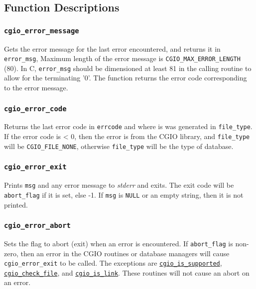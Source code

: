 \subsection{Function Descriptions}

\subsubsection{\texttt{cgio\_error\_message}} \label{error_message}
    \noindent
    Gets the error message for the last error encountered, and returns
    it in \texttt{error\_msg}, Maximum length of the error message is
    \texttt{CGIO\_MAX\_ERROR\_LENGTH} (80). In C, \texttt{error\_msg} should
    be dimensioned at least 81 in the calling routine
    to allow for the terminating '0'. The function returns the error
    code corresponding to the error message.

\subsubsection{\texttt{cgio\_error\_code}} \label{error_code}
    \noindent
    Returns the last error code in \texttt{errcode} and where is was
    generated in \texttt{file\_type}. If the error code is < 0, then
    the error is from the CGIO library, and \texttt{file\_type} will be
    \texttt{CGIO\_FILE\_NONE}, otherwise \texttt{file\_type} will be the
    type of database.

\subsubsection{\texttt{cgio\_error\_exit}} \label{error_exit}
    \noindent
    Prints \texttt{msg} and any error message to \textit{stderr} and exits.
    The exit code will be \texttt{abort\_flag} if it is set, else -1.
    If \texttt{msg} is \texttt{NULL} or
    an empty string, then it is not printed.

\subsubsection{\texttt{cgio\_error\_abort}} \label{error_abort}
    \noindent
    Sets the flag to abort (exit) when an error is encountered. If
    \texttt{abort\_flag} is non-zero, then an error in the CGIO routines
    or database managers will cause \texttt{cgio\_error\_exit} to be called.
    The exceptions are
    \hyperlink{is_supported}{\texttt{cgio\_is\_supported}},
    \hyperlink{check_file}{\texttt{cgio\_check\_file}}, and
    \hyperlink{is_link}{\texttt{cgio\_is\_link}}. These routines
    will not cause an abort on an error.

